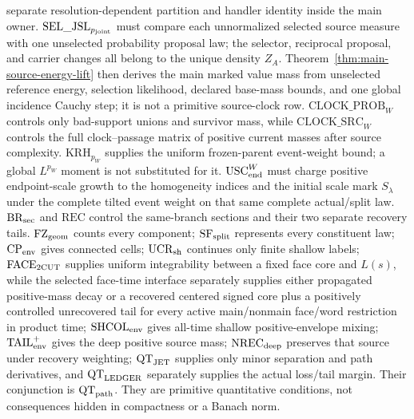 \documentclass[11pt]{article}
\begin{document}
separate resolution-dependent partition and handler identity inside the
main owner.  $\mathrm{SEL\_JSL}_{p_{\rm joint}}$ must compare each
unnormalized selected source measure with one unselected probability proposal
law; the selector, reciprocal proposal, and carrier changes all belong to
the unique density $Z_A$.  Theorem~\ref{thm:main-source-energy-lift} then
derives the main marked value mass from unselected reference energy,
selection likelihood, declared base-mass bounds, and one global incidence
Cauchy step; it is not a primitive source-clock row.  $\mathrm{CLOCK\_PROB}_{W}$
controls only bad-support
unions and survivor mass, while $\mathrm{CLOCK\_SRC}_{W}$ controls the full
clock--passage matrix of positive current masses after source complexity.
$\mathrm{KRH}_{p_W}$ supplies the uniform frozen-parent event-weight bound;
a global $L^{p_W}$ moment is not substituted for it.
$\mathrm{USC}_{\rm end}^{W}$ must charge positive endpoint-scale growth to the
homogeneity indices and the initial scale mark $S_\lambda$ under the complete
tilted event weight on that same complete actual/split law.
$\mathrm{BR}_{\rm sec}$ and $\mathrm{REC}$ control the same-branch
sections and their two separate recovery tails.
$\mathrm{FZ}_{\rm geom}$ counts every component;
$\mathrm{SF}_{\rm split}$ represents every constituent law;
$\mathrm{CP}_{\rm env}$ gives connected cells;
$\mathrm{UCR}_{\rm sh}$ continues only finite shallow labels;
$\mathrm{FACE}_{\rm 2CUT}$ supplies uniform integrability between a fixed
face core and $L(s)$, while the selected face-time interface separately
supplies either propagated positive-mass decay or a recovered centered
signed core plus a positively controlled unrecovered tail for every active
main/nonmain face/word restriction in product time;
$\mathrm{SHCOL}_{\rm env}$ gives all-time shallow positive-envelope
mixing; $\mathrm{TAIL}_{\rm env}^{+}$ gives the deep positive source mass;
$\mathrm{NREC}_{\rm deep}$ preserves that source under recovery weighting;
$\mathrm{QT}_{\rm JET}$ supplies only minor separation and path derivatives,
and $\mathrm{QT}_{\rm LEDGER}$ separately supplies the actual loss/tail
margin.  Their conjunction is $\mathrm{QT}_{\rm path}$.
They are primitive quantitative conditions, not consequences hidden in
compactness or a Banach norm.
\end{document}
